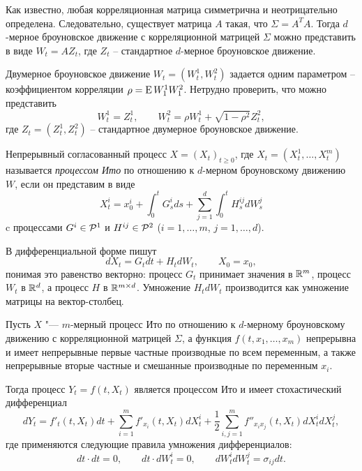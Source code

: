 \begin{remark}
Как известно, любая корреляционная матрица симметрична и неотрицательно определена. Следовательно, существует матрица $A$ такая, что $\Sigma = A^TA$.
Тогда $d$-мерное броуновское движение с корреляционной матрицей $\Sigma$ можно представить в виде $W_t = A Z_t$, где $Z_t$ -- стандартное $d$-мерное броуновское движение.
\end{remark}

\begin{example}
Двумерное броуновское движение $W_t=(W_t^1,W_t^2)$ задается одним параметром -- коэффициентом корреляции $\rho = \operatorname{E} W_1^1W_1^2$.
Нетрудно проверить, что можно представить
\[
W_t^1 = Z_t^1, \qquad W_t^2 = \rho W_t^1 + \sqrt{1-\rho^2} Z_t^2,
\]
где $Z_t = (Z_t^1,Z_t^2)$ -- стандартное двумерное броуновское движение.
\end{example}


\begin{definition}
Непрерывный согласованный процесс $X=(X_t)_{t\ge0}$, где $X_t=(X_t^1,\dots,X_t^m)$ называется \emph{процессом Ито} по отношению к $d$-мерном броуновскому движению $W$, если он представим в виде
\[
X_t^i = x_0^i + \int_0^t G_s^i ds + \sum_{j=1}^d\int_0^t H_s^{ij} d W_s^j
\]
c процессами $G^i \in \mathcal{P}^1$ и $H^{ij}\in \mathcal{P}^2$ ($i=1,\dots,m$, $j=1,\dots,d$). 

В дифференциальной форме пишут
\[
d X_t = G_t dt + H_t dW_t, \qquad X_0=x_0,
\]
понимая это равенство векторно: процесс $G_t$ принимает значения в $\mathbb{R}^m$, процесс $W_t$ в $\mathbb{R}^d$, а процесс $H$ в $\mathbb{R}^{m\times d}$.
Умножение $H_tdW_t$ производится как умножение матрицы на вектор-столбец.
\end{definition}

\begin{theorem}
Пусть $X$ "--- $m$-мерный процесс Ито по отношению к $d$-мерному броуновскому движению с корреляционной матрицей $\Sigma$, а функция $f(t,x_1,\dots,x_m)$ непрерывна и имеет непрерывные первые частные производные по всем переменным, а также непрерывные вторые частные и смешанные производные по переменным $x_i$.

Тогда процесс $Y_t = f(t,X_t)$ является процессом Ито и имеет стохастический дифференциал
\[
d Y_t = f'_t(t,X_t) dt + \sum_{i=1}^m f'_{x_i}(t,X_t) dX_t^i + \frac12 \sum_{i,j=1}^m f''_{x_i x_j}(t,X_t) dX_t^i dX_t^j,
\]
где применяются следующие правила умножения дифференциалов:
\[
dt\cdot dt = 0, \qquad dt\cdot dW_t^i = 0, \qquad dW_t^i dW_t^j = \sigma_{ij} dt.
\]
\end{theorem}

